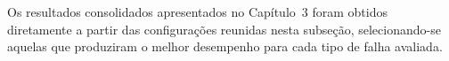 \clearpage

\begingroup
\tiny
\setlength{\tabcolsep}{1.2pt}
\renewcommand{\arraystretch}{0.90}
\setlength{\LTleft}{0pt}
\setlength{\LTright}{0pt}



\endgroup

\clearpage

Os resultados consolidados apresentados no Capítulo~3 foram obtidos diretamente a partir das configurações reunidas nesta subseção, selecionando-se aquelas que produziram o melhor desempenho para cada tipo de falha avaliada.
